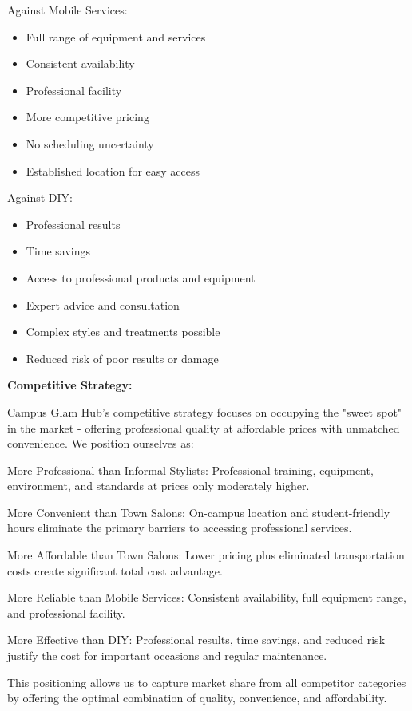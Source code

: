 Against Mobile Services:
\begin{itemize}[leftmargin=2em]
    \item Full range of equipment and services
    \item Consistent availability
    \item Professional facility
    \item More competitive pricing
    \item No scheduling uncertainty
    \item Established location for easy access
\end{itemize}

Against DIY:
\begin{itemize}[leftmargin=2em]
    \item Professional results
    \item Time savings
    \item Access to professional products and equipment
    \item Expert advice and consultation
    \item Complex styles and treatments possible
    \item Reduced risk of poor results or damage
\end{itemize}

\textbf{Competitive Strategy:}

Campus Glam Hub's competitive strategy focuses on occupying the "sweet spot" in the market - offering professional quality at affordable prices with unmatched convenience. We position ourselves as:

More Professional than Informal Stylists: Professional training, equipment, environment, and standards at prices only moderately higher.

More Convenient than Town Salons: On-campus location and student-friendly hours eliminate the primary barriers to accessing professional services.

More Affordable than Town Salons: Lower pricing plus eliminated transportation costs create significant total cost advantage.

More Reliable than Mobile Services: Consistent availability, full equipment range, and professional facility.

More Effective than DIY: Professional results, time savings, and reduced risk justify the cost for important occasions and regular maintenance.

This positioning allows us to capture market share from all competitor categories by offering the optimal combination of quality, convenience, and affordability.

